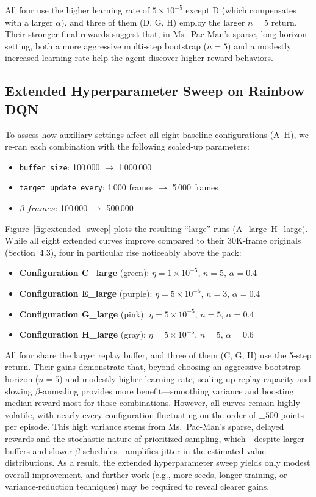 \documentclass{article}
\begin{document}
All four use the higher learning rate of \(5\times10^{-5}\) except D (which compensates with a larger \(\alpha\)), and three of them (D, G, H) employ the larger \(n=5\) return. Their stronger final rewards suggest that, in Ms.\ Pac‑Man’s sparse, long‑horizon setting, both a more aggressive multi‑step bootstrap (\(n=5\)) and a modestly increased learning rate help the agent discover higher‑reward behaviors.

\subsection{Extended Hyperparameter Sweep on Rainbow DQN}

To assess how auxiliary settings affect all eight baseline configurations (A–H), we re‑ran each combination with the following scaled‑up parameters:
\begin{itemize}
  \item \texttt{buffer\_size}: 100\,000 \(\to\) 1\,000\,000  
  \item \texttt{target\_update\_every}: 1\,000 frames \(\to\) 5\,000 frames  
  \item \(\beta\_frames\): 100\,000 \(\to\) 500\,000  
\end{itemize}

Figure~\ref{fig:extended_sweep} plots the resulting “large” runs (A\_large–H\_large). While all eight extended curves improve compared to their 30K‑frame originals (Section 4.3), four in particular rise noticeably above the pack:
\begin{itemize}
  \item \textbf{Configuration C\_large} (green): \(\eta=1\times10^{-5},\,n=5,\,\alpha=0.4\)  
  \item \textbf{Configuration E\_large} (purple): \(\eta=5\times10^{-5},\,n=3,\,\alpha=0.4\)  
  \item \textbf{Configuration G\_large} (pink): \(\eta=5\times10^{-5},\,n=5,\,\alpha=0.4\)  
  \item \textbf{Configuration H\_large} (gray): \(\eta=5\times10^{-5},\,n=5,\,\alpha=0.6\)  
\end{itemize}

All four share the larger replay buffer, and three of them (C, G, H) use the 5‑step return. Their gains demonstrate that, beyond choosing an aggressive bootstrap horizon (\(n=5\)) and modestly higher learning rate, scaling up replay capacity and slowing \(\beta\)-annealing provides more benefit—smoothing variance and boosting median reward most for those combinations. However, all curves remain highly volatile, with nearly every configuration fluctuating on the order of \(\pm500\) points per episode. This high variance stems from Ms.\ Pac-Man’s sparse, delayed rewards and the stochastic nature of prioritized sampling, which—despite larger buffers and slower \(\beta\) schedules—amplifies jitter in the estimated value distributions. As a result, the extended hyperparameter sweep yields only modest overall improvement, and further work (e.g., more seeds, longer training, or variance‐reduction techniques) may be required to reveal clearer gains.  
\end{document}
